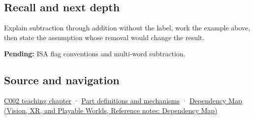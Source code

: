 \subsection{Recall and next depth}\label{appendix-1c7df340573e-recall-and-next-depth}

Explain subtraction through addition without the label, work the example above, then state the assumption whose removal would change the result.

\textbf{Pending:} ISA flag conventions and multi-word subtraction.

\subsection{Source and navigation}\label{appendix-1c7df340573e-source-and-navigation}

\hyperref[01-foundations-i-ch001-arithmetic-becomes-a-policy]{C002 teaching chapter} · \hyperref[appendix-fd090d982a15]{Part definitions and mechanisms} · \href{../07-Vision-XR-and-Playable-Worlds/main.pdf\#nameddest=appendix-4ad47bdd269a}{Dependency Map (Vision, XR, and Playable Worlds, Reference notes: Dependency Map)}

